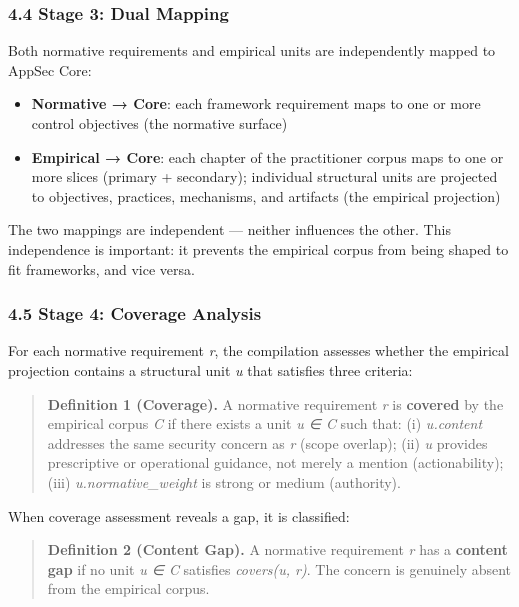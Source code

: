 \documentclass[
]{article}
\providecommand{\tightlist}{%
  \setlength{\itemsep}{0pt}\setlength{\parskip}{0pt}}
\begin{document}
\subsubsection{4.4 Stage 3: Dual Mapping}\label{stage-3-dual-mapping}

Both normative requirements and empirical units are independently mapped
to AppSec Core:

\begin{itemize}
\tightlist
\item
  \textbf{Normative → Core}: each framework requirement maps to one or
  more control objectives (the normative surface)
\item
  \textbf{Empirical → Core}: each chapter of the practitioner corpus
  maps to one or more slices (primary + secondary); individual
  structural units are projected to objectives, practices, mechanisms,
  and artifacts (the empirical projection)
\end{itemize}

The two mappings are independent --- neither influences the other. This
independence is important: it prevents the empirical corpus from being
shaped to fit frameworks, and vice versa.

\subsubsection{4.5 Stage 4: Coverage
Analysis}\label{stage-4-coverage-analysis}

For each normative requirement \emph{r}, the compilation assesses
whether the empirical projection contains a structural unit \emph{u}
that satisfies three criteria:

\begin{quote}
\textbf{Definition 1 (Coverage).} A normative requirement \emph{r} is
\textbf{covered} by the empirical corpus \emph{C} if there exists a unit
\emph{u ∈ C} such that: (i) \emph{u.content} addresses the same security
concern as \emph{r} (scope overlap); (ii) \emph{u} provides prescriptive
or operational guidance, not merely a mention (actionability); (iii)
\emph{u.normative\_weight} is strong or medium (authority).
\end{quote}

When coverage assessment reveals a gap, it is classified:

\begin{quote}
\textbf{Definition 2 (Content Gap).} A normative requirement \emph{r}
has a \textbf{content gap} if no unit \emph{u ∈ C} satisfies
\emph{covers(u, r)}. The concern is genuinely absent from the empirical
corpus.
\end{quote}
\end{document}
